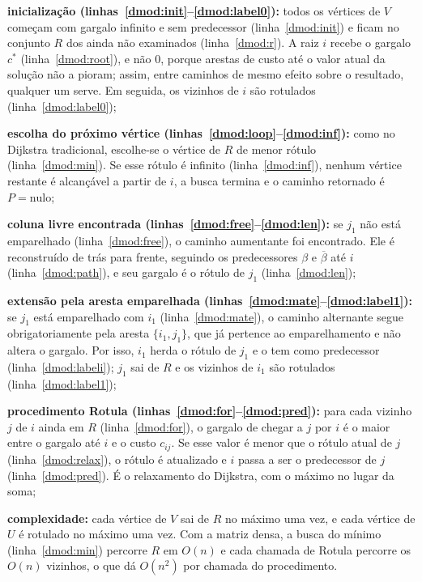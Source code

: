 \begin{alineas}
    \item \textbf{inicialização (linhas~\ref{dmod:init}--\ref{dmod:label0}):} todos os vértices de $V$ começam com gargalo infinito e sem predecessor (linha~\ref{dmod:init}) e ficam no conjunto $R$ dos ainda não examinados (linha~\ref{dmod:r}). A raiz $i$ recebe o gargalo $c^*$ (linha~\ref{dmod:root}), e não $0$, porque arestas de custo até o valor atual da solução não a pioram; assim, entre caminhos de mesmo efeito sobre o resultado, qualquer um serve. Em seguida, os vizinhos de $i$ são rotulados (linha~\ref{dmod:label0});
    \item \textbf{escolha do próximo vértice (linhas~\ref{dmod:loop}--\ref{dmod:inf}):} como no Dijkstra tradicional, escolhe-se o vértice de $R$ de menor rótulo (linha~\ref{dmod:min}). Se esse rótulo é infinito (linha~\ref{dmod:inf}), nenhum vértice restante é alcançável a partir de $i$, a busca termina e o caminho retornado é $P = \mathrm{nulo}$;
    \item \textbf{coluna livre encontrada (linhas~\ref{dmod:free}--\ref{dmod:len}):} se $j_1$ não está emparelhado (linha~\ref{dmod:free}), o caminho aumentante foi encontrado. Ele é reconstruído de trás para frente, seguindo os predecessores $\beta$ e $\overline{\beta}$ até $i$ (linha~\ref{dmod:path}), e seu gargalo é o rótulo de $j_1$ (linha~\ref{dmod:len});
    \item \textbf{extensão pela aresta emparelhada (linhas~\ref{dmod:mate}--\ref{dmod:label1}):} se $j_1$ está emparelhado com $i_1$ (linha~\ref{dmod:mate}), o caminho alternante segue obrigatoriamente pela aresta $\{i_1, j_1\}$, que já pertence ao emparelhamento e não altera o gargalo. Por isso, $i_1$ herda o rótulo de $j_1$ e o tem como predecessor (linha~\ref{dmod:labeli}); $j_1$ sai de $R$ e os vizinhos de $i_1$ são rotulados (linha~\ref{dmod:label1});
    \item \textbf{procedimento Rotula (linhas~\ref{dmod:for}--\ref{dmod:pred}):} para cada vizinho $j$ de $i$ ainda em $R$ (linha~\ref{dmod:for}), o gargalo de chegar a $j$ por $i$ é o maior entre o gargalo até $i$ e o custo $c_{ij}$. Se esse valor é menor que o rótulo atual de $j$ (linha~\ref{dmod:relax}), o rótulo é atualizado e $i$ passa a ser o predecessor de $j$ (linha~\ref{dmod:pred}). É o relaxamento do Dijkstra, com o máximo no lugar da soma;
    \item \textbf{complexidade:} cada vértice de $V$ sai de $R$ no máximo uma vez, e cada vértice de $U$ é rotulado no máximo uma vez. Com a matriz densa, a busca do mínimo (linha~\ref{dmod:min}) percorre $R$ em $O(n)$ e cada chamada de Rotula percorre os $O(n)$ vizinhos, o que dá $O(n^2)$ por chamada do procedimento.
\end{alineas}

